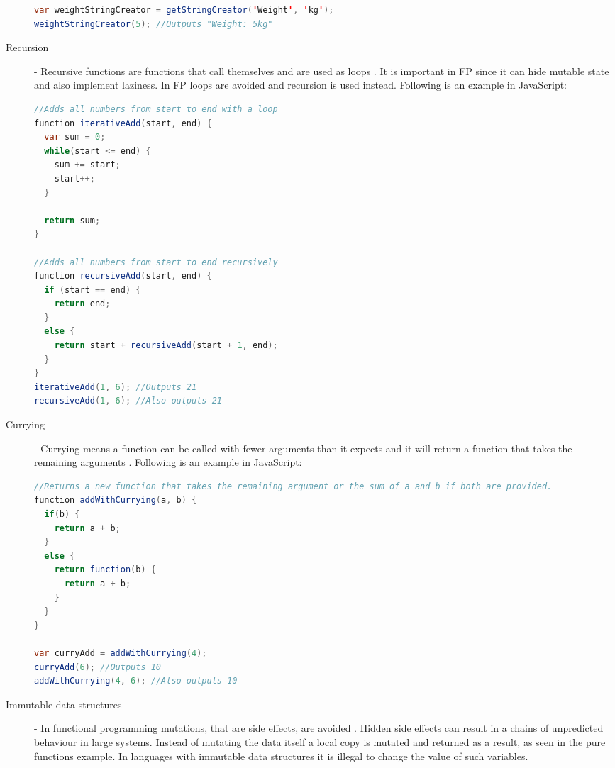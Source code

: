 \documentclass {article}
\begin{document}
\begin{description}
\begin{lstlisting}[language=Java, breaklines=true]
var weightStringCreator = getStringCreator('Weight', 'kg');
weightStringCreator(5); //Outputs "Weight: 5kg"
\end{lstlisting}
 
\item [Recursion] - Recursive functions are functions that call themselves and are used as loops \cite{fogus}. It is important in FP since it can hide mutable state and also implement laziness. In FP loops are avoided and recursion is used instead. Following is an example in JavaScript:
 
\begin{lstlisting}[language=Java]
//Adds all numbers from start to end with a loop
function iterativeAdd(start, end) {
  var sum = 0;
  while(start <= end) {
    sum += start;
    start++;
  }
 
  return sum;
}
 
//Adds all numbers from start to end recursively
function recursiveAdd(start, end) {
  if (start == end) {
    return end;
  }
  else {
    return start + recursiveAdd(start + 1, end);
  }
}
iterativeAdd(1, 6); //Outputs 21
recursiveAdd(1, 6); //Also outputs 21
\end{lstlisting}
 
\item [Currying] - Currying means a function can be called with fewer arguments than it expects and it will return a function that takes the remaining arguments \cite{drboolean}. Following is an example in JavaScript:
 
\begin{lstlisting}[language=Java, breaklines=true]
//Returns a new function that takes the remaining argument or the sum of a and b if both are provided.
function addWithCurrying(a, b) {
  if(b) {
    return a + b;
  }
  else {
    return function(b) {
      return a + b;
    }
  }
}
 
var curryAdd = addWithCurrying(4); 
curryAdd(6); //Outputs 10
addWithCurrying(4, 6); //Also outputs 10
\end{lstlisting}
 
\item [Immutable data structures] - In functional programming mutations, that are side effects, are avoided \cite{fogus}. Hidden side effects can result in a chains of unpredicted behaviour in large systems. Instead of mutating the data itself a local copy is mutated and returned as a result, as seen in the pure functions example. In languages with immutable data structures it is illegal to change the value of such variables.
\end{description}
\end{document}
